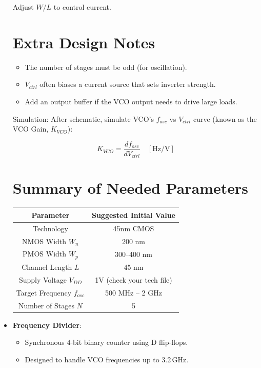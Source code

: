 \begin{itemize}
Adjust $W/L$ to control current.

\section{Extra Design Notes}

\begin{itemize}
    \item The number of stages must be odd (for oscillation).
    \item $V_{ctrl}$ often biases a current source that sets inverter strength.
    \item Add an output buffer if the VCO output needs to drive large loads.
\end{itemize}

Simulation: After schematic, simulate VCO's $f_{osc}$ vs $V_{ctrl}$ curve (known as the VCO Gain, $K_{VCO}$):

\[
K_{VCO} = \frac{d f_{osc}}{d V_{ctrl}} \quad [\mathrm{Hz/V}]
\]

\section{Summary of Needed Parameters}

\begin{center}
\begin{tabular}{|c|c|}
\hline
\textbf{Parameter} & \textbf{Suggested Initial Value} \\
\hline
Technology & 45nm CMOS \\
\hline
NMOS Width $W_n$ & 200 nm \\
\hline
PMOS Width $W_p$ & 300–400 nm \\
\hline
Channel Length $L$ & 45 nm \\
\hline
Supply Voltage $V_{DD}$ & 1V (check your tech file) \\
\hline
Target Frequency $f_{osc}$ & 500 MHz – 2 GHz \\
\hline
Number of Stages $N$ & 5 \\
\hline
\end{tabular}
\end{center}


    \item \textbf{Frequency Divider}:
    \begin{itemize}
        \item Synchronous 4-bit binary counter using D flip-flops.
        \item Designed to handle VCO frequencies up to 3.2\,GHz.
    \end{itemize}
\end{itemize}

